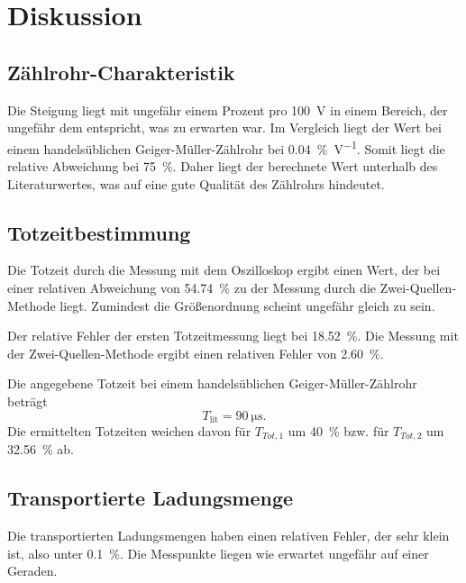 \section{Diskussion}
\label{sec:Diskussion}

\subsection{Zählrohr-Charakteristik}

Die Steigung liegt mit ungefähr einem Prozent pro \SI{100}{\volt} in einem Bereich, der ungefähr dem entspricht, was zu erwarten war. Im Vergleich liegt der Wert bei einem handelsüblichen Geiger-Müller-Zählrohr \cite{vergleich} bei \SI{0.04}{\percent\per\volt}. Somit liegt die relative Abweichung bei \SI{75}{\percent}. Daher liegt der berechnete Wert unterhalb des Literaturwertes, was auf eine gute Qualität des Zählrohrs hindeutet. 

\subsection{Totzeitbestimmung}

Die Totzeit durch die Messung mit dem Oszilloskop ergibt einen Wert, der bei einer relativen Abweichung von \SI{54.74}{\percent} zu der Messung durch die Zwei-Quellen-Methode liegt. 
Zumindest die Größenordnung scheint ungefähr gleich zu sein. 

\noindent Der relative Fehler der ersten Totzeitmessung liegt bei \SI{18.52}{\percent}. Die Messung mit der Zwei-Quellen-Methode ergibt einen relativen Fehler von \SI{2.60}{\percent}.

\noindent Die angegebene Totzeit bei einem handelsüblichen Geiger-Müller-Zählrohr \cite{vergleich} beträgt
\begin{equation*}
    T_\text{lit} = \SI{90}{\micro\second}.
\end{equation*}
Die ermittelten Totzeiten weichen davon für $T_{Tot,1}$ um \SI{40}{\percent} bzw. für $T_{Tot,2}$ um \SI{32.56}{\percent} ab.

\subsection{Transportierte Ladungsmenge}

Die transportierten Ladungsmengen haben einen relativen Fehler, der sehr klein ist, also unter \SI{0.1}{\percent}. Die Messpunkte liegen wie erwartet ungefähr auf einer Geraden. 
